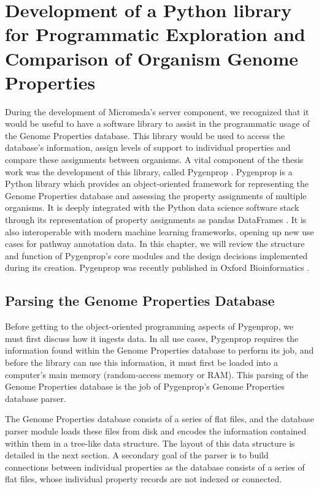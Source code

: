 \chapter{Development of a Python library for Programmatic Exploration and Comparison of Organism Genome Properties}

During the development of Micromeda's server component, we recognized that it would be useful to have a software library to assist in the programmatic usage of the Genome Properties database. This library would be used to access the database's information, assign levels of support to individual properties and compare these assignments between organisms. A vital component of the thesis work was the development of this library, called Pygenprop \cite{bergstrand2019pygenprop}. Pygenprop is a Python library which provides an object-oriented framework \cite{booch1986object} for representing the Genome Properties database and assessing the property assignments of multiple organisms. It is deeply integrated with the Python data science software stack \cite{scipystack} through its representation of property assignments as pandas DataFrames  \cite{mckinney2010data}. It is also interoperable with modern machine learning frameworks, opening up new use cases for pathway annotation data. In this chapter, we will review the structure and function of Pygenprop's core modules and the design decisions implemented during its creation. Pygenprop was recently published in Oxford Bioinformatics \cite{bergstrand2019pygenprop}.

\section{Parsing the Genome Properties Database}

Before getting to the object-oriented programming aspects of Pygenprop, we must first discuss how it ingests data. In all use cases, Pygenprop requires the information found within the Genome Properties database to perform its job, and before the library can use this information, it must first be loaded into a computer's main memory (random-access memory or RAM). This parsing of the Genome Properties database is the job of Pygenprop's Genome Properties database parser.

The Genome Properties database consists of a series of flat files, and the database parser module loads these files from disk and encodes the information contained within them in a tree-like data structure. The layout of this data structure is detailed in the next section. A secondary goal of the parser is to build connections between individual properties as the database consists of a series of flat files, whose individual property records are not indexed or connected. 


